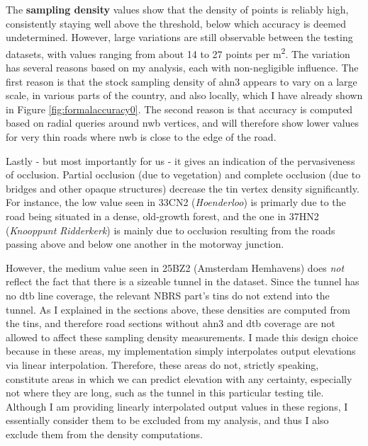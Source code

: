 The \textbf{sampling density} values show that the density of points is reliably high, consistently staying well above the threshold, below which accuracy is deemed undetermined. However, large variations are still observable between the testing datasets, with values ranging from about 14 to 27 points per m\textsuperscript{2}. The variation has several reasons based on my analysis, each with non-negligible influence. The first reason is that the stock sampling density of \ac{ahn3} appears to vary on a large scale, in various parts of the country, and also locally, which I have already shown in Figure \ref{fig:formalaccuracy0}. The second reason is that accuracy is computed based on radial queries around \ac{nwb} vertices, and will therefore show lower values for very thin roads where \ac{nwb} is close to the edge of the road.

Lastly - but most importantly for us - it gives an indication of the pervasiveness of occlusion. Partial occlusion (due to vegetation) and complete occlusion (due to bridges and other opaque structures) decrease the \ac{tin} vertex density significantly. For instance, the low value seen in 33CN2 (\textit{Hoenderloo}) is primarly due to the road being situated in a dense, old-growth forest, and the one in 37HN2 (\textit{Knooppunt Ridderkerk}) is mainly due to occlusion resulting from the roads passing above and below one another in the motorway junction.

However, the medium value seen in 25BZ2 (Amsterdam Hemhavens) does \textit{not} reflect the fact that there is a sizeable tunnel in the dataset. Since the tunnel has no \ac{dtb} line coverage, the relevant NBRS part's \ac{tin}s do not extend into the tunnel. As I explained in the sections above, these densities are computed from the \ac{tin}s, and therefore road sections without \ac{ahn3} and \ac{dtb} coverage are not allowed to affect these sampling density measurements. I made this design choice because in these areas, my implementation simply interpolates output elevations via linear interpolation. Therefore, these areas do not, strictly speaking, constitute areas in which we can predict elevation with any certainty, especially not where they are long, such as the tunnel in this particular testing tile. Although I am providing linearly interpolated output values in these regions, I essentially consider them to be excluded from my analysis, and thus I also exclude them from the density computations.

